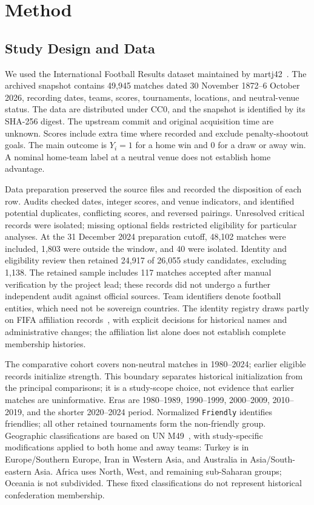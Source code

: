 \section{Method}
\label{sec:method}

\subsection{Study Design and Data}
\label{sec:data-design}

We used the International Football Results dataset maintained by martj42~\cite{martj42_data}. The archived snapshot contains 49,945 matches dated 30 November 1872--6 October 2026, recording dates, teams, scores, tournaments, locations, and neutral-venue status. The data are distributed under CC0, and the snapshot is identified by its SHA-256 digest. The upstream commit and original acquisition time are unknown. Scores include extra time where recorded and exclude penalty-shootout goals. The main outcome is $Y_i=1$ for a home win and $0$ for a draw or away win. A nominal home-team label at a neutral venue does not establish home advantage.

Data preparation preserved the source files and recorded the disposition of each row. Audits checked dates, integer scores, and venue indicators, and identified potential duplicates, conflicting scores, and reversed pairings. Unresolved critical records were isolated; missing optional fields restricted eligibility for particular analyses. At the 31 December 2024 preparation cutoff, 48,102 matches were included, 1,803 were outside the window, and 40 were isolated. Identity and eligibility review then retained 24,917 of 26,055 study candidates, excluding 1,138. The retained sample includes 117 matches accepted after manual verification by the project lead; these records did not undergo a further independent audit against official sources. Team identifiers denote football entities, which need not be sovereign countries. The identity registry draws partly on FIFA affiliation records~\cite{fifa2018affiliations}, with explicit decisions for historical names and administrative changes; the affiliation list alone does not establish complete membership histories.

The comparative cohort covers non-neutral matches in 1980--2024; earlier eligible records initialize strength. This boundary separates historical initialization from the principal comparisons; it is a study-scope choice, not evidence that earlier matches are uninformative. Eras are 1980--1989, 1990--1999, 2000--2009, 2010--2019, and the shorter 2020--2024 period. Normalized \texttt{Friendly} identifies friendlies; all other retained tournaments form the non-friendly group. Geographic classifications are based on UN M49~\cite{un_m49}, with study-specific modifications applied to both home and away teams: Turkey is in Europe/Southern Europe, Iran in Western Asia, and Australia in Asia/South-eastern Asia. Africa uses North, West, and remaining sub-Saharan groups; Oceania is not subdivided. These fixed classifications do not represent historical confederation membership.

